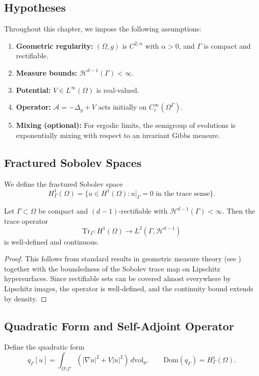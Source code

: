 \subsection{Hypotheses}
Throughout this chapter, we impose the following assumptions:
\begin{enumerate}[label=(H\arabic*), leftmargin=12mm]
  \item \textbf{Geometric regularity:} $(\Omega,g)$ is $C^{2,\alpha}$ with
        $\alpha > 0$, and $\Gamma$ is compact and rectifiable.
  \item \textbf{Measure bounds:} $\mathcal{H}^{d-1}(\Gamma) < \infty$.
  \item \textbf{Potential:} $V \in L^\infty(\Omega)$ is real-valued.
  \item \textbf{Operator:} $\mathcal{A} = -\Delta_g + V$ acts initially on
        $C_c^\infty(\Omega^\Gamma)$.
  \item \textbf{Mixing (optional):} For ergodic limits, the semigroup of
        evolutions is exponentially mixing with respect to an invariant Gibbs
        measure.
\end{enumerate}

\subsection{Fractured Sobolev Spaces}
We define the fractured Sobolev space
\[
H^1_\Gamma(\Omega) = \{ u \in H^1(\Omega) : u|_\Gamma = 0 \text{ in the trace sense} \}.
\]

\begin{lemma}
\label{lem:trace}
Let $\Gamma \subset \Omega$ be compact and $(d-1)$-rectifiable with
$\mathcal{H}^{d-1}(\Gamma) < \infty$. Then the trace operator
\[
\mathrm{Tr}_\Gamma : H^1(\Omega) \to L^2(\Gamma, \mathcal{H}^{d-1})
\]
is well-defined and continuous.
\end{lemma}

\begin{proof}
This follows from standard results in geometric measure theory (see
\cite{EvansGariepy2015}) together with the boundedness of the Sobolev trace
map on Lipschitz hypersurfaces. Since rectifiable sets can be covered almost
everywhere by Lipschitz images, the operator is well-defined, and the
continuity bound extends by density.
\end{proof}

\subsection{Quadratic Form and Self-Adjoint Operator}
Define the quadratic form
\[
q_\Gamma[u] = \int_{\Omega \setminus \Gamma} \left( |\nabla u|^2 + V|u|^2 \right) \, d\mathrm{vol}_g,
\qquad \mathrm{Dom}(q_\Gamma) = H^1_\Gamma(\Omega).
\]

